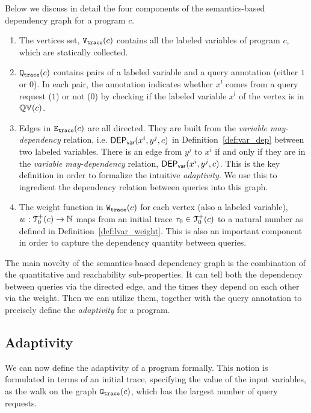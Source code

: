 Below we discuss in detail the four components of the semantics-based dependency graph for a program $c$.
\begin{enumerate}
 \item The vertices set, $\mathtt{{V_{trace}}}({c})$ contains all the labeled variables of program $c$,
 which are statically collected.
 \item $\mathtt{{Q_{trace}}}(c)$ contains pairs of a labeled variable and a query annotation (either $1$ or $0$).
  In each pair, the annotation indicates whether $x^l$ comes from a query request ($1$) or not ($0$) by checking if the labeled variable $x^l$ of the vertex is in $\mathbb{QV}(c)$.
 \item Edges in $\mathtt{{E_{trace}}}(c)$ are all directed.
 They are built from the \emph{variable may-dependency} relation, i.e. $\mathsf{DEP_{var}}(x^i, y^j, c)$ in Definition~\ref{def:var_dep} between two labeled variables.
 There is an edge from $y^j$ to $x^i$ if and only if they are in the \emph{variable may-dependency} relation, $\mathsf{DEP_{var}}(x^i, y^j, c)$. 
 This is the key definition in order to formalize the intuitive \emph{adaptivity}. We use this to ingredient the dependency relation between queries into this graph.
 \item 
The weight function in $\mathtt{{W_{trace}}}(c)$ for each vertex (also a labeled variable), $w : \mathcal{T}^{+}_0(c) \to \mathbb{N}$
maps from an initial trace $\mathtt{\tau}_0 \in \mathcal{T}^{+}_0(c)$ to a natural number as defined in Definition~\ref{def:lvar_weight}.
This is also an important component in order to capture the dependency quantity between queries.
\end{enumerate}

The main novelty of the semantics-based dependency graph is the combination of the quantitative and reachability sub-properties. 
It can tell both the dependency between queries via the directed edge, and the times they depend on each other via the weight.
Then we can utilize them, together with the query annotation to precisely define the \emph{adaptivity} for a program.



\subsection{Adaptivity}
We can now define the adaptivity of a program formally. This notion is formulated in terms of an initial trace, specifying the value of the input variables, as the walk on the graph $\mathtt{{G_{trace}}}({c})$, which has the largest number of query requests.


